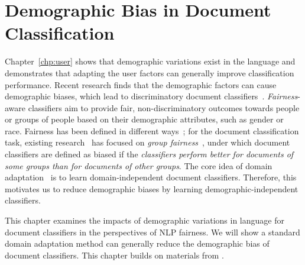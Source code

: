\chapter{Demographic Bias in Document Classification}
\label{chp:fairness}

Chapter~\ref{chp:user} shows that demographic variations exist in the language and demonstrates that adapting the user factors can generally improve classification performance.
Recent research finds that the demographic factors can cause demographic biases, which lead to discriminatory document classifiers~\cite{dixon2018measuring, kiritchenko2018examining, park2018reducing, garg2019counterfactual, borkan2019nuanced}.
\textit{Fairness}-aware classifiers aim to provide fair, non-discriminatory outcomes towards people or groups of people based on their demographic attributes, such as gender or race. 
Fairness has been defined in different ways~\cite{hardt2016equality, burke2020algorithmic}; for the document classification task, existing research~\cite{dixon2018measuring, kiritchenko2018examining, park2018reducing, garg2019counterfactual, heindorf2019debiasing} has focused on \textit{group fairness}~\cite{chouldechova2018frontiers}, under which document classifiers are defined as biased if the \textit{classifiers perform better for documents of some groups than for documents of other groups}.
The core idea of domain adaptation~\cite{daume2007frustratingly} is to learn domain-independent document classifiers.
Therefore, this motivates us to reduce demographic biases by learning demographic-independent classifiers.

This chapter examines the impacts of demographic variations in language for document classifiers in the perspectives of NLP fairness.
We will show a standard domain adaptation method can generally reduce the demographic bias of document classifiers.
This chapter builds on materials from \cite{huang2020multilingual}.

